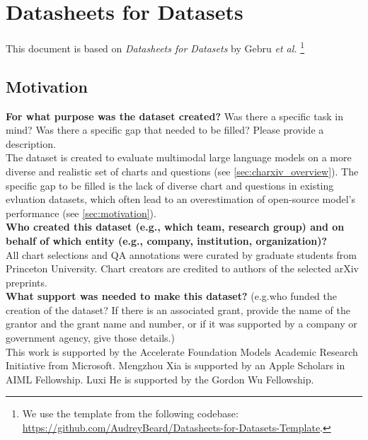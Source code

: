 \newpage
\section{Datasheets for Datasets}
\noindent
This document is based on \textit{Datasheets for Datasets} by Gebru \textit{et
al.} \cite{gebru2021datasheets}\footnote{We use the template from the following codebase: \url{https://github.com/AudreyBeard/Datasheets-for-Datasets-Template}.
}


\subsection{Motivation}

    \textcolor{\sectioncolor}{\textbf{For what purpose was the dataset created?
    }
    Was there a specific task in mind? Was there
    a specific gap that needed to be filled? Please provide a description.
    } \\
    The dataset is created to evaluate multimodal large language models on a more diverse and realistic set of charts and questions (see \cref{sec:charxiv_overview}). The specific gap to be filled is the lack of diverse chart and questions in existing evluation datasets, which often lead to an overestimation of open-source model's performance (see \cref{sec:motivation}). \\
    
    \textcolor{\sectioncolor}{\textbf{Who created this dataset (e.g., which team, research group) and on behalf
    of which entity (e.g., company, institution, organization)?
    }
    } \\
    All chart selections and QA annotations were curated by graduate students from Princeton University. Chart creators are credited to authors of the selected arXiv preprints. \\
    
    \textcolor{\sectioncolor}{\textbf{What support was needed to make this dataset?
    }
    (e.g.who funded the creation of the dataset? If there is an associated
    grant, provide the name of the grantor and the grant name and number, or if
    it was supported by a company or government agency, give those details.)
    } \\
    This work is supported by the Accelerate Foundation Models Academic Research Initiative from Microsoft. Mengzhou Xia is supported by an Apple Scholars in AIML Fellowship. Luxi He is supported by the Gordon Wu Fellowship. \\
    
